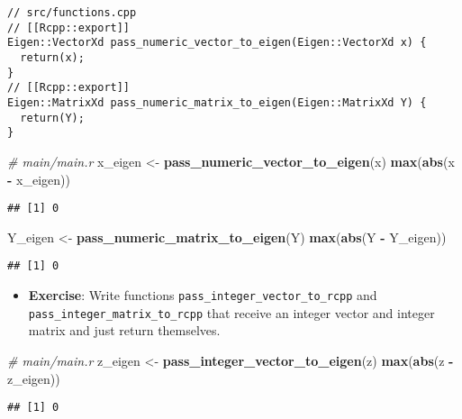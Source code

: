 \documentclass[
]{book}
\newenvironment{Shaded}{\begin{snugshade}}{\end{snugshade}}
\newcommand{\CommentTok}[1]{\textcolor[rgb]{0.56,0.35,0.01}{\textit{#1}}}
\newcommand{\KeywordTok}[1]{\textcolor[rgb]{0.13,0.29,0.53}{\textbf{#1}}}
\newcommand{\NormalTok}[1]{#1}
\newcommand{\OperatorTok}[1]{\textcolor[rgb]{0.81,0.36,0.00}{\textbf{#1}}}
\newcommand{\StringTok}[1]{\textcolor[rgb]{0.31,0.60,0.02}{#1}}
\providecommand{\tightlist}{%
  \setlength{\itemsep}{0pt}\setlength{\parskip}{0pt}}
\begin{document}
\begin{verbatim}
// src/functions.cpp
// [[Rcpp::export]]
Eigen::VectorXd pass_numeric_vector_to_eigen(Eigen::VectorXd x) {
  return(x);
}
// [[Rcpp::export]]
Eigen::MatrixXd pass_numeric_matrix_to_eigen(Eigen::MatrixXd Y) {
  return(Y);
}
\end{verbatim}

\begin{Shaded}
\begin{Highlighting}[]
\CommentTok{# main/main.r}
\NormalTok{x_eigen <-}\StringTok{ }\KeywordTok{pass_numeric_vector_to_eigen}\NormalTok{(x)}
\KeywordTok{max}\NormalTok{(}\KeywordTok{abs}\NormalTok{(x }\OperatorTok{-}\StringTok{ }\NormalTok{x_eigen))}
\end{Highlighting}
\end{Shaded}

\begin{verbatim}
## [1] 0
\end{verbatim}

\begin{Shaded}
\begin{Highlighting}[]
\NormalTok{Y_eigen <-}\StringTok{ }\KeywordTok{pass_numeric_matrix_to_eigen}\NormalTok{(Y)}
\KeywordTok{max}\NormalTok{(}\KeywordTok{abs}\NormalTok{(Y }\OperatorTok{-}\StringTok{ }\NormalTok{Y_eigen))}
\end{Highlighting}
\end{Shaded}

\begin{verbatim}
## [1] 0
\end{verbatim}

\begin{itemize}
\tightlist
\item
  \textbf{Exercise}: Write functions \texttt{pass\_integer\_vector\_to\_rcpp} and \texttt{pass\_integer\_matrix\_to\_rcpp} that receive an integer vector and integer matrix and just return themselves.
\end{itemize}

\begin{Shaded}
\begin{Highlighting}[]
\CommentTok{# main/main.r}
\NormalTok{z_eigen <-}\StringTok{ }\KeywordTok{pass_integer_vector_to_eigen}\NormalTok{(z)}
\KeywordTok{max}\NormalTok{(}\KeywordTok{abs}\NormalTok{(z }\OperatorTok{-}\StringTok{ }\NormalTok{z_eigen))}
\end{Highlighting}
\end{Shaded}

\begin{verbatim}
## [1] 0
\end{verbatim}
\end{document}
